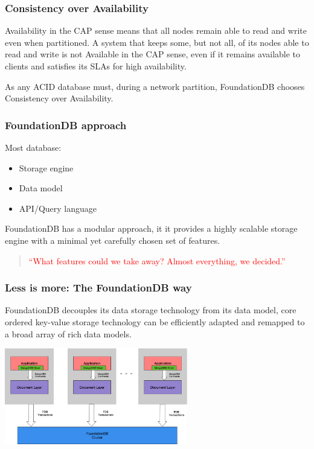 
\begin{frame}
	\frametitle{Consistency over Availability}

 Availability in the CAP sense means that all nodes remain able to read and write even when partitioned. A system that keeps some, but not all, of its nodes able to read and write is not Available in the CAP sense, even if it remains available to clients and satisfies its SLAs for high availability.
\vspace{0.5cm}

As any ACID database must, during a network partition, FoundationDB chooses Consistency over Availability. 

\end{frame}


\begin{frame}
	\frametitle{FoundationDB approach}
Most database: 
    \begin{itemize}
        \item Storage engine
        \item Data model
        \item API/Query language
    \end{itemize}

FoundationDB has a modular approach, it it provides a highly scalable storage engine with a minimal yet carefully chosen set of features.

\vspace{0.5cm}
\begin{quote}
    \textcolor{red}{``What features could we take away? Almost everything, we decided.''}
\end{quote}
        
\end{frame}



\begin{frame}
	\frametitle{Less is more: The FoundationDB way}
FoundationDB decouples its data storage technology from its data model, core ordered key-value storage technology can be efficiently adapted and remapped to a broad array of rich data models.
\vspace{0.5cm}

\begin{center}
    \includegraphics[width=0.6\textwidth]{img/1-Introduction/sidecar-arch.png}
\end{center}

\end{frame}

